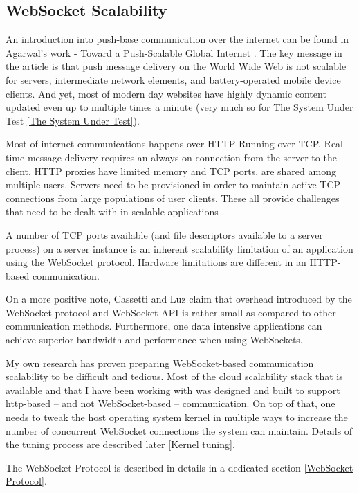 \documentclass{uvamscse}
\begin{document}
\subsection{WebSocket Scalability}\label{WebSocket Scalability}

An introduction into push-base communication over the internet can be found in Agarwal’s work - Toward a Push-Scalable Global Internet \cite{PushScale}. The key message in the article is that push message delivery on the World Wide Web is not scalable for servers, intermediate network elements, and battery-operated mobile device clients. And yet, most of modern day websites have highly dynamic content updated even up to multiple times a minute (very much so for The System Under Test \ref{The System Under Test}).

Most of internet communications happens over HTTP Running over TCP. Real-time message delivery requires an always-on connection from the server to the client. HTTP proxies have limited memory and TCP ports, are shared among multiple users. Servers need to be provisioned in order to maintain active TCP connections from large populations of user  clients. These all provide challenges that need to be dealt with in scalable applications \cite{PushScale}.

A number of TCP ports available (and file descriptors available to a server process) on a server instance is an inherent scalability limitation of an application using the WebSocket protocol. Hardware limitations are different in an HTTP-based communication.

On a more positive note, Cassetti and Luz \cite{WebsApi} claim that overhead introduced by the WebSocket protocol and WebSocket API is rather small as compared to other communication methods. Furthermore, one data intensive applications can achieve superior bandwidth and performance when using WebSockets.

My own research has proven preparing WebSocket-based communication scalability to be difficult and tedious. Most of the cloud scalability stack that is available and that I have been working with was designed and built to support http-based -- and not WebSocket-based -- communication. On top of that, one needs to tweak the host operating system kernel in multiple ways to increase the number of concurrent WebSocket connections the system can maintain. Details of the tuning process are described later \ref{Kernel tuning}.

The WebSocket Protocol is described in details in a dedicated section \ref{WebSocket Protocol}.
\end{document}
